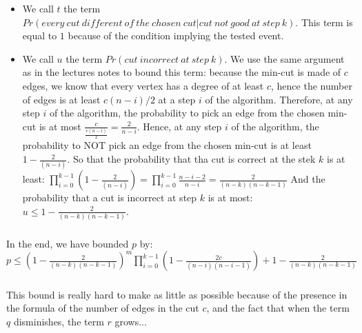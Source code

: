 \begin{itemize}
\item We call $t$ the term $Pr(every\: cut\: different\: of\: the\: chosen\: cut | cut\: not\: good\: at\: step\: k)$.
\newline
This term is equal to $1$ because of the condition implying the tested event.
\item We call $u$ the term $Pr(cut\: incorrect\: at\: step\: k)$.
\newline
We use the same argument as in the lectures notes to bound this term: because the min-cut is made of $c$ edges, we know that every vertex has a degree of at least $c$, hence the number of edges is at least $c(n-i)/2$ at a step $i$ of the algorithm.
\newline
Therefore, at any step $i$ of the algorithm, the probability to pick an edge from the chosen min-cut is at most $\frac{c}{\frac{c(n-i)}{2}}=\frac{2}{n-i}$.
\newline
Hence, at any step $i$ of the algorithm, the probability to NOT pick an edge from the chosen min-cut is at least $1-\frac{2}{(n-i)}$.
\newline
So that the probability that tha cut is correct at the stek $k$ is at least:
\newline
$\prod_{i=0}^{k-1}{(1-\frac{2}{(n-i)})} = \prod_{i=0}^{k-1}{\frac{n-i-2}{n-i}} = \frac{2}{(n-k)(n-k-1)}$
\newline
And the probability that a cut is incorrect at step $k$ is at most:
\newline
$u \leq 1 -  \frac{2}{(n-k)(n-k-1)}$.
\end{itemize}
\subparagraph{}
In the end, we have bounded $p$ by:
\newline
$p \leq (1 - \frac{2}{(n-k)(n-k-1)})^m \prod_{i=0}^{k-1}{(1-\frac{2c}{(n-i)(n-i-1)})} + 1 -  \frac{2}{(n-k)(n-k-1)}$
\subparagraph{}
This bound is really hard to make as little as possible because of the presence in the formula of the number of edges in the cut $c$, and the fact that when the term $q$ disminishes, the term $r$ grows...
\newline